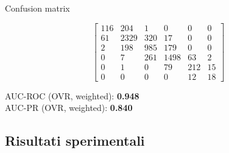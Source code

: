 \documentclass[a4paper,12pt]{report}
\begin{document}
	\begin{table}[H]
		\centering
		\caption{Confusion matrix}
		\label{tab:cm_kan}
		\[
		\begin{bmatrix}
			116 & 204 & 1   & 0   & 0   & 0   \\
			61  & 2329& 320 & 17  & 0   & 0   \\
			2   & 198 & 985 & 179 & 0   & 0   \\
			0   & 7   & 261 & 1498& 63  & 2   \\
			0   & 1   & 0   & 79  & 212 & 15  \\
			0   & 0   & 0   & 0   & 12  & 18
		\end{bmatrix}
		\]
		\vspace{1mm}
		
		AUC-ROC (OVR, weighted): \textbf{0.948} \\
		AUC-PR  (OVR, weighted): \textbf{0.840}
	\end{table}
	
	\subsection{Risultati sperimentali}
	
\end{document}
